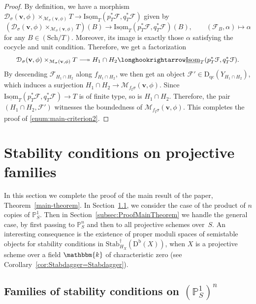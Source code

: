 \documentclass[11pt, reqno]{amsart}
\numberwithin{equation}{section}
\theoremstyle{plain}
\theoremstyle{remark}
\theoremstyle{definition}
\theoremstyle{italicsname}
\newcommand{\bv}{\mathbf{v}}
\newcommand{\Db}{\mathrm{D^b}}
\newcommand{\Dqc}{\mathrm{D}_{\mathrm{qc}}}
\newcommand{\Stabdagger}{\mathrm{Stab}^\dagger}
\newcommand{\cF}{\mathcal{F}}
\newcommand{\cM}{\mathcal{M}}
\newcommand{\KK}{\mathbbm{k}}
\def\PP{\ensuremath{\mathbb{P}}}
\DeclareRobustCommand\longtwoheadrightarrow
{\relbar\joinrel\twoheadrightarrow}
\begin{document}
\begin{proof}
By definition, we have a morphism $\mathcal{D}_{{\sigma}}(\bv,\phi)\times_{\cM_{{\sigma}}(\bv,\phi)} T \to \underline{\mathrm{Isom}}_T(p_T^*\cF, q_T^*\cF)$ given by 
\[
\left(\mathcal{D}_{{\sigma}}(\bv,\phi)\times_{\cM_{{\sigma}}(\bv,\phi)} T\right)(B)\longrightarrow\underline{\mathrm{Isom}}_T(p_T^*\cF, q_T^*\cF)(B),\qquad (\cF_B, \alpha)\longmapsto \alpha
\]
for any $B\in (\mathrm{Sch}/T)$. 
Moreover, its image is exactly those $\alpha$ satisfying the cocycle and unit condition. 
Therefore, we get a factorization 
\[
\mathcal{D}_{{\sigma}}(\bv,\phi)\times_{\cM_{{\sigma}}(\bv,\phi)} T\longtwoheadrightarrow H_1\cap H_2\longhookrightarrow \underline{\mathrm{Isom}}_T(p_T^*\cF, q_T^*\cF).
\]
By descending $\cF_{H_1\cap H_2}$ along $f_{H_1\cap H_2}$, we then get an object $\cF'\in \Dqc(Y_{H_1\cap H_2})$, which induces a surjection $H_1\cap H_2\to \cM_{f_{\sharp}{\sigma}}(\bv,\phi)$. 
Since $\underline{\mathrm{Isom}}_T(p_T^*\cF, q_T^*\cF)\to T$ is of finite type, so is $H_1\cap H_2$. 
Therefore, the pair $(H_1\cap H_2, \cF')$ witnesses the boundedness of $\cM_{f_{\sharp}{\sigma}}(\bv,\phi)$.
This completes the proof of \ref{enum:main-criterion2}.
\end{proof}



\section{Stability conditions on projective families}\label{sec:ProjectiveFamilies}

In this section we complete the proof of the main result of the paper, Theorem~\ref{main-theorem}.
In Section~\ref{subsec:FamiliesStabilityP1n}, we consider the case of the product of $n$ copies of $\PP^1_S$. 
Then in Section~\ref{subsec:ProofMainTheorem} we handle the general case, by first passing to $\PP^n_S$ and then to all projective schemes over~$S$.
An interesting consequence is the existence of proper moduli spaces of semistable objects for stability conditions in $\Stabdagger_{H_X}(\Db(X))$, when $X$ is a projective scheme over a field $\KK$ of characteristic zero (see Corollary~\ref{cor:Stabdagger=Stabdagger}).

\subsection{Families of stability conditions on $(\PP^1_S)^n$}\label{subsec:FamiliesStabilityP1n}
\end{document}
